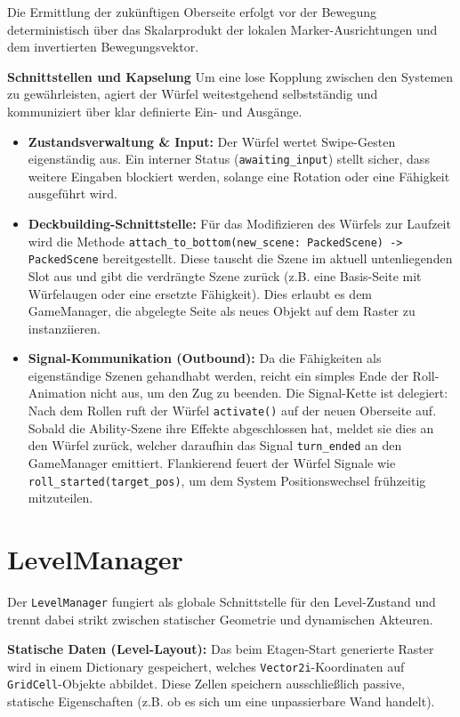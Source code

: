 \documentclass[oneside]{ausarbeitung}
\begin{document}
Die Ermittlung der zukünftigen Oberseite erfolgt vor der Bewegung deterministisch über das Skalarprodukt der lokalen Marker-Ausrichtungen und dem invertierten Bewegungsvektor.

\textbf{Schnittstellen und Kapselung}
Um eine lose Kopplung zwischen den Systemen zu gewährleisten, agiert der Würfel weitestgehend selbstständig und kommuniziert über klar definierte Ein- und Ausgänge.

\begin{itemize}
    \item \textbf{Zustandsverwaltung \& Input:} Der Würfel wertet Swipe-Gesten eigenständig aus. Ein interner Status (\texttt{awaiting\_input}) stellt sicher, dass weitere Eingaben blockiert werden, solange eine Rotation oder eine Fähigkeit ausgeführt wird.
    
    \item \textbf{Deckbuilding-Schnittstelle:} Für das Modifizieren des Würfels zur Laufzeit wird die Methode \texttt{attach\_to\_bottom(new\_scene: PackedScene) -> PackedScene} bereitgestellt. Diese tauscht die Szene im aktuell untenliegenden Slot aus und gibt die verdrängte Szene zurück (z.B. eine Basis-Seite mit Würfelaugen oder eine ersetzte Fähigkeit). Dies erlaubt es dem GameManager, die abgelegte Seite als neues Objekt auf dem Raster zu instanziieren.
    
    \item \textbf{Signal-Kommunikation (Outbound):} Da die Fähigkeiten als eigenständige Szenen gehandhabt werden, reicht ein simples Ende der Roll-Animation nicht aus, um den Zug zu beenden. Die Signal-Kette ist delegiert: Nach dem Rollen ruft der Würfel \texttt{activate()} auf der neuen Oberseite auf. Sobald die Ability-Szene ihre Effekte abgeschlossen hat, meldet sie dies an den Würfel zurück, welcher daraufhin das Signal \texttt{turn\_ended} an den GameManager emittiert. Flankierend feuert der Würfel Signale wie \texttt{roll\_started(target\_pos)}, um dem System Positionswechsel frühzeitig mitzuteilen.
\end{itemize}

\section{LevelManager}

Der \texttt{LevelManager} fungiert als globale Schnittstelle für den Level-Zustand und trennt dabei strikt zwischen statischer Geometrie und dynamischen Akteuren.

\textbf{Statische Daten (Level-Layout):}
Das beim Etagen-Start generierte Raster wird in einem Dictionary gespeichert, welches \texttt{Vector2i}-Koordinaten auf \texttt{GridCell}-Objekte abbildet. Diese Zellen speichern ausschließlich passive, statische Eigenschaften (z.B. ob es sich um eine unpassierbare Wand handelt).
\end{document}
